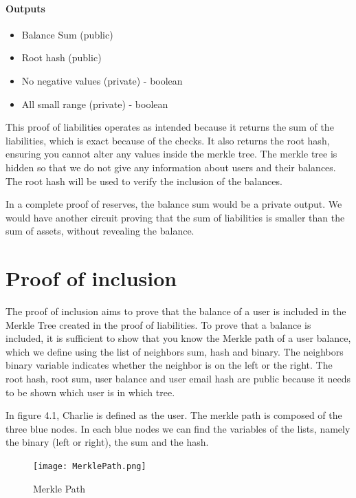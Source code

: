 \paragraph{Outputs}
\begin{itemize}
   \item Balance Sum (public)
   \item Root hash (public)
   \item No negative values (private) - boolean
   \item All small range (private) - boolean
   \end{itemize}


This proof of liabilities operates as intended because it returns the sum of the liabilities, which is exact because of the checks.
It also returns the root hash, ensuring you cannot alter any values inside the merkle tree. The merkle tree is hidden so that we do not
give any information about users and their balances.
The root hash will be used to verify the inclusion of the balances.




In a complete proof of reserves, the balance sum would be a private output. We would have another circuit proving that the sum of liabilities is smaller
than the sum of assets, without revealing the balance.




\section{Proof of inclusion}
\label{subsec:pi}
The proof of inclusion aims to prove that the balance of a user is included in the Merkle Tree created in the proof of liabilities.
To prove that a balance is included, it is sufficient to show that you know the Merkle path of a user balance,
which we define using the list of neighbors sum, hash and binary.
The neighbors binary variable indicates whether the neighbor is on the left or the right.
The root hash, root sum, user balance and user email hash are public because it needs to be shown which user is in which tree.


In figure 4.1, Charlie is defined as the user. The merkle path is composed of the three blue nodes. In each blue nodes we can find the variables of the lists,
namely the binary (left or right), the sum and the hash.
\begin{figure}[H]
   \centering
   \texttt{[image: MerklePath.png]}
   \caption{Merkle Path \cite{BM22}}
   \label{overflow}
   \end{figure}



